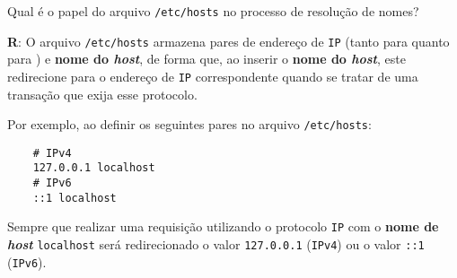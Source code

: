 Qual é o papel do arquivo \texttt{/etc/hosts} no processo de resolução de  nomes?

\textbf{R}: O arquivo \texttt{/etc/hosts} armazena pares de endereço de \texttt{IP} (tanto para  quanto para ) e \textbf{nome do \emph{host}}, de forma que, ao inserir o \textbf{nome do \emph{host}}, este redirecione para o endereço de \texttt{IP} correspondente quando se tratar de uma transação que exija esse protocolo.

Por exemplo, ao definir os seguintes pares no arquivo \texttt{/etc/hosts}:
\begin{lstlisting}
	# IPv4
	127.0.0.1 localhost
	# IPv6
	::1 localhost
\end{lstlisting}

Sempre que realizar uma requisição utilizando o protocolo \texttt{IP} com o \textbf{nome de \emph{host}} \texttt{localhost} será redirecionado o valor \texttt{127.0.0.1} (\texttt{IPv4}) ou o valor \texttt{::1} (\texttt{IPv6}).

